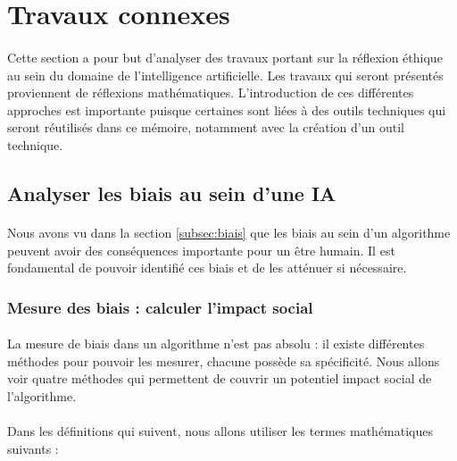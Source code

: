 \documentclass[10pt, french, a4paper]{report}
\begin{document}
\section{Travaux connexes}
\label{sec:travaux}

\paragraph{}
Cette section a pour but d’analyser des travaux portant sur la réflexion éthique au sein du domaine de l’intelligence artificielle. Les travaux qui seront présentés proviennent de réflexions mathématiques. L’introduction de ces différentes approches est importante puisque certaines sont liées à des outils techniques qui seront réutilisés dans ce mémoire, notamment avec la création d’un outil technique.

\subsection{Analyser les biais au sein d'une IA}

\paragraph{}
Nous avons vu dans la section \ref{subsec:biais} que les biais au sein d'un algorithme peuvent avoir des conséquences importante pour un être humain. Il est fondamental de pouvoir identifié ces biais et de les atténuer si nécessaire. 

\subsubsection{Mesure des biais : calculer l'impact social}
\label{subsec:mesures_biais}

\paragraph{}
La mesure de biais dans un algorithme n'est pas absolu : il existe différentes méthodes pour pouvoir les mesurer, chacune possède sa spécificité. Nous allons voir quatre méthodes qui permettent de couvrir un potentiel impact social de l'algorithme.

\paragraph{}
Dans les définitions qui suivent, nous allons utiliser les termes mathématiques suivants :
\end{document}
